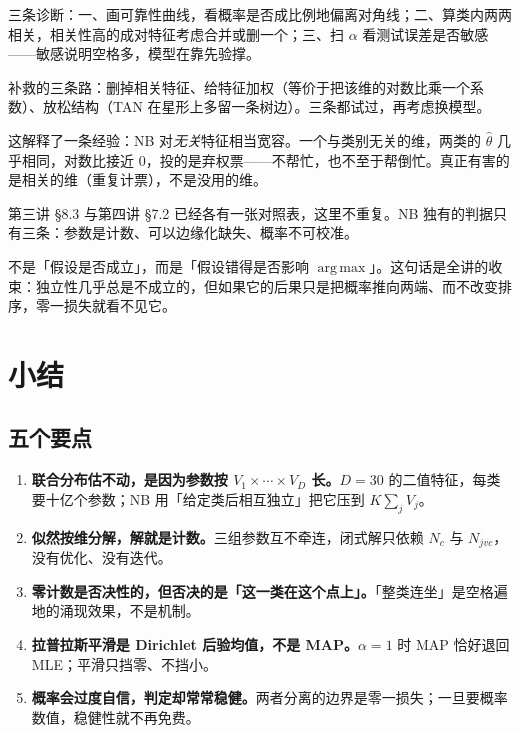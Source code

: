 \documentclass[11pt,a4paper,fontset=windows,zihao=-4]{ctexart}
\DeclareMathOperator*{\argmax}{arg\,max}
\begin{document}
三条诊断：一、画可靠性曲线，看概率是否成比例地偏离对角线；二、算类内两两相关，相关性高的成对特征考虑合并或删一个；三、扫 $\alpha$ 看测试误差是否敏感——敏感说明空格多，模型在靠先验撑。

补救的三条路：删掉相关特征、给特征加权（等价于把该维的对数比乘一个系数）、放松结构（TAN 在星形上多留一条树边）。三条都试过，再考虑换模型。

这解释了一条经验：NB 对\emph{无关}特征相当宽容。一个与类别无关的维，两类的 $\hat\theta$ 几乎相同，对数比接近 $0$，投的是弃权票——不帮忙，也不至于帮倒忙。真正有害的是相关的维（重复计票），不是没用的维。

第三讲 §8.3 与第四讲 §7.2 已经各有一张对照表，这里不重复。NB 独有的判据只有三条：参数是计数、可以边缘化缺失、概率不可校准。

\begin{keybox}[选型的判据]
不是「假设是否成立」，而是「假设错得是否影响 $\argmax$」。这句话是全讲的收束：独立性几乎总是不成立的，但如果它的后果只是把概率推向两端、而不改变排序，零一损失就看不见它。
\end{keybox}


\section{小结}

\subsection{五个要点}

\begin{enumerate}[label=\textcolor{navy}{\bfseries\arabic*.},leftmargin=2.3em,itemsep=0.55em]
  \item \textbf{联合分布估不动，是因为参数按 $V_1\times\cdots\times V_D$ 长。}$D=30$ 的二值特征，每类要十亿个参数；NB 用「给定类后相互独立」把它压到 $K\sum_jV_j$。
  \item \textbf{似然按维分解，解就是计数。}三组参数互不牵连，闭式解只依赖 $N_c$ 与 $N_{jvc}$，没有优化、没有迭代。
  \item \textbf{零计数是否决性的，但否决的是「这一类在这个点上」。}「整类连坐」是空格遍地的涌现效果，不是机制。
  \item \textbf{拉普拉斯平滑是 Dirichlet 后验均值，不是 MAP。}$\alpha=1$ 时 MAP 恰好退回 MLE；平滑只挡零、不挡小。
  \item \textbf{概率会过度自信，判定却常常稳健。}两者分离的边界是零一损失；一旦要概率数值，稳健性就不再免费。
\end{enumerate}
\end{document}
